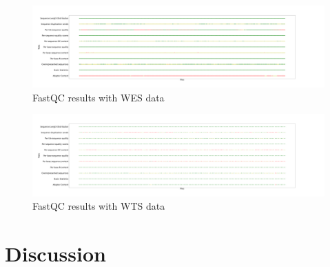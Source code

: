 \documentclass[a4paper]{article}
\begin{document}
            \begin{figure}[p]
                \centering
                \includegraphics[width=0.8 \linewidth]{figures/FastQC/FastQC_WES.png}
                \caption{FastQC results  with WES data}
                \label{fig:fastqc-wes}
            \end{figure}

            \begin{figure}[p]
                \centering
                \includegraphics[width=0.8 \linewidth]{figures/FastQC/FastQC_WTS.png}
                \caption{FastQC results with WTS data}
                \label{fig:fastqc-wts}
            \end{figure}

    \section{Discussion}

    
    
\end{document}
